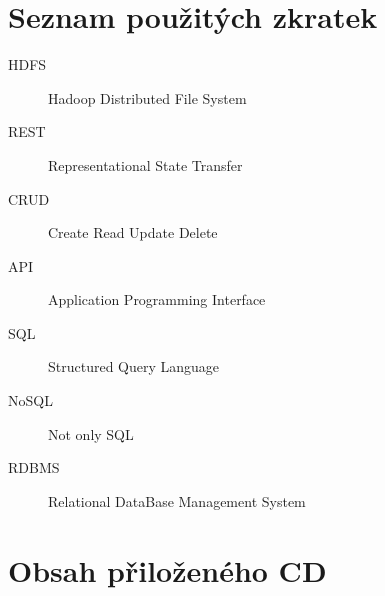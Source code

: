 \documentclass[thesis=M,czech]{FITthesis}[2012/06/26]
\begin{document}
\appendix

\chapter{Seznam použitých zkratek}
\begin{description}
	\item[HDFS] Hadoop Distributed File System
	\item[REST] Representational State Transfer
	\item[CRUD] Create Read Update Delete
	\item[API] Application Programming Interface
	\item[SQL] Structured Query Language
	\item[NoSQL] Not only SQL
	\item[RDBMS] Relational DataBase Management System
	

\end{description}



\chapter{Obsah přiloženého CD}


\begin{figure}
\end{figure}
\end{document}
